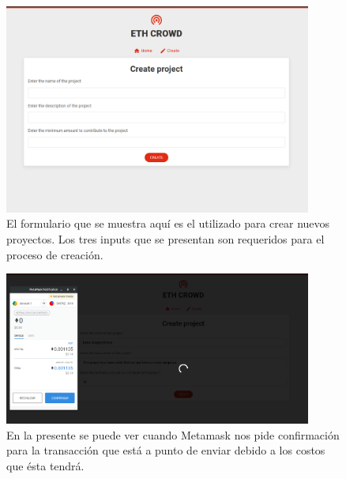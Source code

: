 \begin{figure}[H] 
\centering    
\includegraphics[width=0.9\textwidth]{new-project}
\caption[new-project]{El formulario que se muestra aquí es el utilizado para crear nuevos proyectos. Los tres inputs que se presentan son requeridos para el proceso de creación.}
\label{fig:new-project}
\end{figure}

\begin{figure}[H] 
\centering    
\includegraphics[width=0.9\textwidth]{new-project-metamask}
\caption[new-project-metamask]{En la presente se puede ver cuando Metamask nos pide confirmación para la transacción que está a punto de enviar debido a los costos que ésta tendrá.}
\label{fig:new-project-metamask}
\end{figure}

